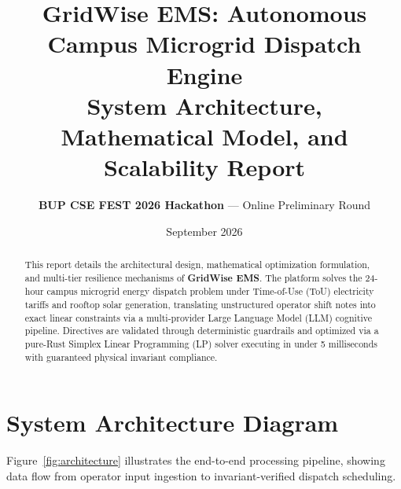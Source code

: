 \documentclass[11pt,a4paper]{article}
\title{\textbf{GridWise EMS: Autonomous Campus Microgrid Dispatch Engine}\\[0.4ex]
\large System Architecture, Mathematical Model, and Scalability Report}
\author{\textbf{BUP CSE FEST 2026 Hackathon} --- Online Preliminary Round}
\date{September 2026}
\begin{document}
\maketitle

\begin{abstract}
This report details the architectural design, mathematical optimization formulation, and multi-tier resilience mechanisms of \textbf{GridWise EMS}. The platform solves the 24-hour campus microgrid energy dispatch problem under Time-of-Use (ToU) electricity tariffs and rooftop solar generation, translating unstructured operator shift notes into exact linear constraints via a multi-provider Large Language Model (LLM) cognitive pipeline. Directives are validated through deterministic guardrails and optimized via a pure-Rust Simplex Linear Programming (LP) solver executing in under 5 milliseconds with guaranteed physical invariant compliance.
\end{abstract}

\vspace{1em}

\section{System Architecture Diagram}

Figure~\ref{fig:architecture} illustrates the end-to-end processing pipeline, showing data flow from operator input ingestion to invariant-verified dispatch scheduling.
\end{document}
